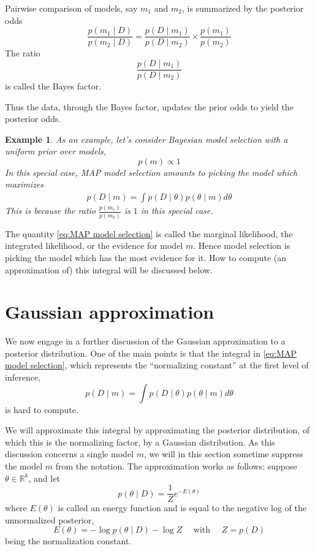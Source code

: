 \documentclass[11pt]{article}
\theoremstyle{plain} %
\newtheorem{example}[theorem]{Example}
\theoremstyle{remark}
\begin{document}
Pairwise comparison of models, say $m_{1}$ and $m_{2}$, is summarized by
the posterior odds
$$
  \frac{p\left(m_{1} \mid D\right)}{p\left(m_{2} \mid D\right)}=\frac{p\left(D \mid m_{1}\right)}{p\left(D \mid m_{2}\right)} \times \frac{p\left(m_{1}\right)}{p\left(m_{2}\right)}
$$
The ratio
$$
  \frac{p\left(D \mid m_{1}\right)}{p\left(D \mid m_{2}\right)}
$$
is called the {\color{C3}Bayes factor}.

Thus the data, through the Bayes factor, updates the prior odds to yield
the posterior odds.

\begin{example}
  As an example, let's consider Bayesian model selection with a uniform
  prior over models,
  $$
    p(m) \propto 1
  $$
  In this special case, MAP model selection amounts to picking the model
  which maximizes
  \begin{align}
    p(D \mid m)=\int p(D \mid \theta) p(\theta \mid m) d \theta
    \label{eq:MAP model selection}
  \end{align}
  This is because the ratio $\frac{p\left(m_{1}\right)}{p\left(m_{2}\right)}$ is $1$ in this special case.
\end{example}

The quantity \cref{eq:MAP model selection} is called the {\color{C3}marginal likelihood}, the {\color{C3}integrated
    likelihood}, or the {\color{C3}evidence for model $m$}. Hence model selection is picking the model which has the most evidence
for it. How to compute (an approximation of) this integral will be discussed
below.

\section{Gaussian approximation}
We now engage in a further discussion of the Gaussian approximation to a
posterior distribution.  One of the main points is that the integral in \cref{eq:MAP model selection}, which represents
the ``normalizing constant'' at the first level of inference,
$$
  p(D \mid m)=\int p(D \mid \theta) p(\theta \mid m) d \theta
$$
is hard to compute.

We will approximate this integral by approximating the posterior
distribution, of which this is the normalizing factor, by a Gaussian
distribution. As this discussion concerns a single model $m$, we will in this section
sometime suppress the model $m$ from the notation. The approximation works as follows: suppose $\theta \in \mathbb{R}^{k}$,
and let
$$
  p(\theta \mid D)=\frac{1}{Z} e^{-E(\theta)}
$$
where $E(\theta)$ is called an {\color{C3}energy function} and is equal to the negative log
of the unnormalized posterior,
$$
  E(\theta)=-\log p(\theta \mid D) - \log Z \quad \text{ with } \quad Z=p(D)
$$
being the normalization constant.
\end{document}
